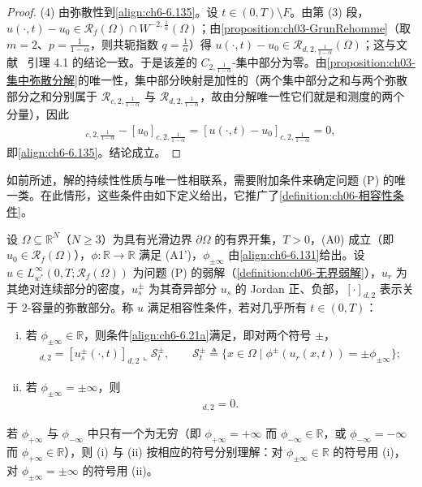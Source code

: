 \documentclass[../../main.tex]{subfiles}%
\begin{document}
\begin{proof}
(4) 由弥散性到\eqref{align:ch6-6.135}。设 $t\in(0,T)\setminus F$。由第 (3) 段，$u(\cdot,t)-u_0\in\mathscr{R}_f(\Omega)\cap W^{-2,\frac{1}{\alpha}}(\Omega)$；由\cref{proposition:ch03-GrunRehomme}（取 $m=2$、$p=\frac{1}{1-\alpha}$，则共轭指数 $q=\frac{1}{\alpha}$）得 $u(\cdot,t)-u_0\in\mathscr{R}_{d,2,\frac{1}{1-\alpha}}(\Omega)$；这与文献~\cite{ref10} 引理 4.1 的结论一致。于是该差的 $C_{2,\frac{1}{1-\alpha}}$-集中部分为零。由\cref{proposition:ch03-集中弥散分解}的唯一性，集中部分映射是加性的（两个集中部分之和与两个弥散部分之和分别属于 $\mathscr{R}_{c,2,\frac{1}{1-\alpha}}$ 与 $\mathscr{R}_{d,2,\frac{1}{1-\alpha}}$，故由分解唯一性它们就是和测度的两个分量），因此
\begin{align*}
[u(\cdot,t)]_{c,2,\frac{1}{1-\alpha}}-[u_0]_{c,2,\frac{1}{1-\alpha}}
=[u(\cdot,t)-u_0]_{c,2,\frac{1}{1-\alpha}}=0,
\end{align*}
即\eqref{align:ch6-6.135}。结论成立。
\end{proof}

如前所述，解的持续性性质与唯一性相联系，需要附加条件来确定问题 (P) 的唯一类。在此情形，这些条件由如下定义给出，它推广了\cref{definition:ch06-相容性条件}。

\begin{definition}\label{definition:ch06-无界相容性}
设 $\Omega\subseteq\mathbb{R}^N$（$N\geqslant3$）为具有光滑边界 $\partial\Omega$ 的有界开集，$T>0$，(A0) 成立（即 $u_0\in\mathscr{R}_f(\Omega)$），$\phi:\mathbb{R}\to\mathbb{R}$ 满足 (A1')，$\phi_{\pm\infty}$ 由\eqref{align:ch6-6.131}给出。设 $u\in L^\infty_{w^*}(0,T;\mathscr{R}_f(\Omega))$ 为问题 (P) 的弱解（\cref{definition:ch06-无界弱解}），$u_r$ 为其绝对连续部分的密度，$u^\pm_s$ 为其奇异部分 $u_s$ 的 Jordan 正、负部，$[\cdot]_{d,2}$ 表示关于 $2$-容量的弥散部分。称 $u$ 满足相容性条件，若对几乎所有 $t\in(0,T)$：
\begin{enumerate}[(i)]
\item 若 $\phi_{\pm\infty}\in\mathbb{R}$，则条件\eqref{align:ch6-6.21a}满足，即对两个符号 $\pm$，
\begin{align*}
[u^\pm_s(\cdot,t)]_{d,2}=[u^\pm_s(\cdot,t)]_{d,2}\llcorner\mathscr{S}^\pm_t,
\qquad \mathscr{S}^\pm_t\triangleq\{x\in\Omega\mid\phi^\pm(u_r(x,t))=\pm\phi_{\pm\infty}\};
\end{align*}
\item 若 $\phi_{\pm\infty}=\pm\infty$，则
\begin{align}
[u^\pm_s(\cdot,t)]_{d,2}=0. \label{align:ch6-6.137}
\end{align}
\end{enumerate}
若 $\phi_{+\infty}$ 与 $\phi_{-\infty}$ 中只有一个为无穷（即 $\phi_{+\infty}=+\infty$ 而 $\phi_{-\infty}\in\mathbb{R}$，或 $\phi_{-\infty}=-\infty$ 而 $\phi_{+\infty}\in\mathbb{R}$），则 (i) 与 (ii) 按相应的符号分别理解：对 $\phi_{\pm\infty}\in\mathbb{R}$ 的符号用 (i)，对 $\phi_{\pm\infty}=\pm\infty$ 的符号用 (ii)。
\end{definition}
\end{document}
